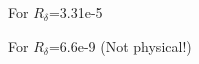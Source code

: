 \documentclass{article}
\begin{document}
\begin{figure}%
\begin{center}
\renewcommand{\figure}{Fig.}
\caption{For $R_\delta$=3.31e-5}
\end{center}
\end{figure}

\begin{figure}%
\begin{center}
\renewcommand{\figure}{Fig.}
\caption{For $R_\delta$=6.6e-9 (Not physical!)}
\end{center}
\end{figure}
\end{document}

